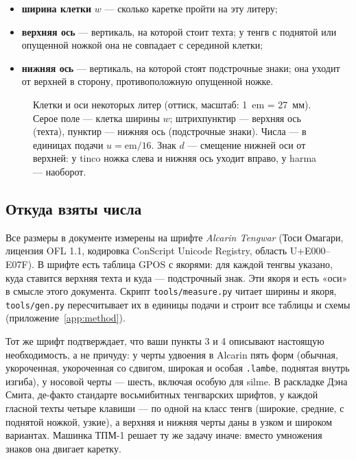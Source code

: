 \documentclass[11pt,a4paper]{article}
\newlength\tgem \setlength\tgem{5mm}
\newcommand\tgu{0.001\tgem}
\newcommand\code[1]{\texttt{#1}}
\begin{document}
\begin{itemize}
  \item \textbf{ширина клетки} $w$ — сколько каретке пройти на эту литеру;
  \item \textbf{верхняя ось} — вертикаль, на которой стоит техта; у тенгв с поднятой или опущенной ножкой она не совпадает с серединой клетки;
  \item \textbf{нижняя ось} — вертикаль, на которой стоят подстрочные знаки; она уходит от верхней в сторону, противоположную опущенной ножке.
\end{itemize}

\begin{figure}[h]
\centering
\setlength\tgem{27mm}
\begin{tikzpicture}[x=\tgu,y=\tgu]

\end{tikzpicture}
\caption{Клетки и оси некоторых литер (оттиск, масштаб: 1~em = 27~мм). Серое поле — клетка ширины $w$; штрихпунктир — верхняя ось (техта), пунктир — нижняя ось (подстрочные знаки). Числа — в единицах подачи $u = \mathrm{em}/16$. Знак $d$ — смещение нижней оси от верхней: у tinco ножка слева и нижняя ось уходит вправо, у harma — наоборот.}
\label{fig:anatomy}
\end{figure}

\subsection{Откуда взяты числа}

Все размеры в документе измерены на шрифте \emph{Alcarin Tengwar} (Тоси Омагари, лицензия OFL 1.1, кодировка ConScript Unicode Registry, область U+E000--E07F). В шрифте есть таблица GPOS с якорями: для каждой тенгвы указано, куда ставится верхняя техта и куда — подстрочный знак. Эти якоря и есть «оси» в смысле этого документа. Скрипт \code{tools/measure.py} читает ширины и якоря, \code{tools/gen.py} пересчитывает их в единицы подачи и строит все таблицы и схемы (приложение~\ref{app:method}).

Тот же шрифт подтверждает, что ваши пункты 3 и 4 описывают настоящую необходимость, а не причуду: у черты удвоения в Alcarin пять форм (обычная, укороченная, укороченная со сдвигом, широкая и особая \code{.lambe}, поднятая внутрь изгиба), у носовой черты — шесть, включая особую для silme. В раскладке Дэна Смита, де-факто стандарте восьмибитных тенгварских шрифтов, у каждой гласной техты четыре клавиши — по одной на класс тенгв (широкие, средние, с поднятой ножкой, узкие), а верхняя и нижняя черты даны в узком и широком вариантах. Машинка ТПМ-1 решает ту же задачу иначе: вместо умножения знаков она двигает каретку.
\end{document}
